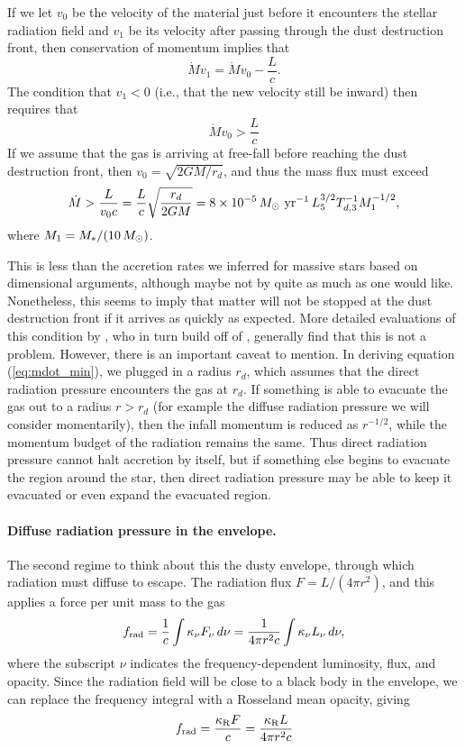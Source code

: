 If we let $v_0$ be the velocity of the material just before it encounters the stellar radiation field and $v_1$ be its velocity after passing through the dust destruction front, then conservation of momentum implies that
\begin{equation}
\dot{M} v_1 = \dot{M} v_0 - \frac{L}{c}.
\end{equation}
The condition that $v_1 < 0$ (i.e., that the new velocity still be inward) then requires that
\begin{equation}
\dot{M} v_0 > \frac{L}{c}
\end{equation}
If we assume that the gas is arriving at free-fall before reaching the dust destruction front, then $v_0 = \sqrt{2 G M/r_d}$, and thus the mass flux must exceed
\begin{equation}
\label{eq:mdot_min}
\dot{M} > \frac{L}{v_0 c} = \frac{L}{c} \sqrt{\frac{r_d}{2 G M}} = 8\times 10^{-5} \,\msun\mbox{ yr}^{-1} \, L_{5}^{3/2} T_{d,3}^{-1} M_{1}^{-1/2},
\end{equation}
where $M_{1}=M_*/(10\,M_{\odot})$.

This is less than the accretion rates we inferred for massive stars based on dimensional arguments, although maybe not by quite as much as one would like. Nonetheless, this seems to imply that matter will not be stopped at the dust destruction front if it arrives as quickly as expected. More detailed evaluations of this condition by \citet{mckee03a}, who in turn build off of \citet{wolfire87a}, generally find that this is not a problem. However, there is an important caveat to mention. In deriving equation (\ref{eq:mdot_min}), we plugged in a radius $r_d$, which assumes that the direct radiation pressure encounters the gas at $r_d$. If something is able to evacuate the gas out to a radius $r > r_d$ (for example the diffuse radiation pressure we will consider momentarily), then the infall momentum is reduced as $r^{-1/2}$, while the momentum budget of the radiation remains the same. Thus direct radiation pressure cannot halt accretion by itself, but if something else begins to evacuate the region around the star, then direct radiation pressure may be able to keep it evacuated or even expand the evacuated region.

\paragraph{Diffuse radiation pressure in the envelope.} The second regime to think about this the dusty envelope, through which radiation must diffuse to escape. The radiation flux $F=L/(4\pi r^2)$, and this applies a force per unit mass to the gas
\begin{equation}
f_{\rm rad} = \frac{1}{c} \int \kappa_{\nu} F_{\nu} \, d\nu = \frac{1}{4\pi r^2 c} \int \kappa_{\nu} L_{\nu} \, d\nu,
\end{equation}
where the subscript $\nu$ indicates the frequency-dependent luminosity, flux, and opacity. Since the radiation field will be close to a black body in the envelope, we can replace the frequency integral with a Rosseland mean opacity, giving
\begin{equation}
f_{\rm rad} = \frac{\kappa_{\rm R} F}{c} = \frac{\kappa_{\rm R} L}{4\pi r^2 c}
\end{equation}

